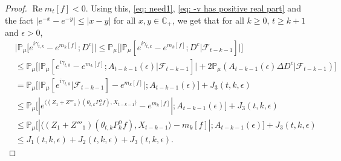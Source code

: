 \documentclass[12pt,a4paper]{amsart}
\theoremstyle{plain}
\theoremstyle{definition}
\numberwithin{equation}{section}
\begin{document}
\begin{proof}
$\operatorname {Re} m_t[f] < 0$. 
Using this, \eqref{eq: need1}, \eqref{eq: -v has positive real part} and the fact
$|e^{-x} - e^{-y}| \leq |x-y|$ for all $x,y \in \mathbb C_+$,
    we get that for all $k\geq 0$, $t\geq k+1$ and $\epsilon> 0$,
\begin{align}
\label{eq: inequality that will used later}
    &\big|\mathbb{P}_{\mu}\big[e^{i\gamma_{t,k}}-e^{m_k[f]}; D^c\big]\big|
    \leq \mathbb{P}_{\mu}\Big[\big| \mathbb{P}_{\mu}[e^{i\gamma_{t,k}}-e^{m_k[f]}; D^c | \mathscr F_{t-k-1}]\big|\Big]
    \\& \leq \mathbb{P}_{\mu}\Big[\big| \mathbb{P}_{\mu}[e^{i\gamma_{t,k}}-e^{m_k[f]}; A_{t-k-1}(\epsilon)| \mathscr F_{t-k-1}]\big| + 2\mathbb P_\mu(A_{t-k-1}(\epsilon) \Delta D^c| \mathscr F_{t-k-1})\Big]
    \\& = \mathbb{P}_{\mu}\Big[ \big|\mathbb{P}_{\mu}[e^{i\gamma_{t,k}}| \mathscr F_{t-k-1}]-e^{m_k[f]}\big|;A_{t-k-1}(\epsilon)\Big] + J_3(t,k,\epsilon)
    \\& \leq \mathbb{P}_{\mu}\big[|e^{\langle (Z_1+Z'''_1) (\theta_{t,k}P^\alpha_k f),X_{t-k-1}\rangle}-e^{m_k[f]}|;A_{t-k-1}(\epsilon)\big]+  J_3(t,k,\epsilon)
    \\& \leq \mathbb{P}_{\mu}\big[|\langle (Z_1+Z'''_1)(\theta_{t,k}P^\alpha_k f),X_{t-k-1}\rangle-m_k[f]|;A_{t-k-1}(\epsilon)\big]+  J_3(t,k,\epsilon)
    \\&\leq J_1(t,k,\epsilon) + J_2(t,k,\epsilon)+J_3(t,k,\epsilon).
\end{align}


\end{proof}
\end{document}
